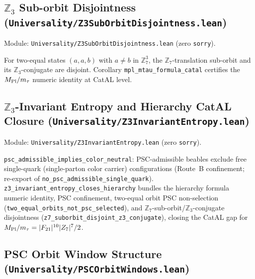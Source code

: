 \documentclass[11pt,a4paper]{article}
\newenvironment{keybox}[1]{%
  \Needspace*{8\baselineskip}%
  \begin{tcolorbox}[
    enhanced,
    breakable=false,
    colback=blue!5,
    colframe=blue!45!black,
    coltitle=black,
    colbacktitle=blue!14,
    boxrule=0.85pt,
    arc=2.5pt,
    left=9pt, right=9pt, top=6pt, bottom=6pt,
    titlerule=0.55pt,
    fonttitle=\bfseries,
    title={#1},
    before upper=\raggedright,
    before skip=0.9\baselineskip,
    after skip=0.9\baselineskip
  ]%
}{%
  \end{tcolorbox}%
}
\theoremstyle{definition}
\begin{document}
\subsection{$\mathbb{Z}_3$ Sub-orbit Disjointness
  (\texttt{Universality/\allowbreak Z3SubOrbitDisjointness.lean})}\label{subsec:z3-suborbit}

Module: \texttt{Universality/Z3SubOrbitDisjointness.lean} (zero \lstinline|sorry|).

\begin{keybox}{\lstinline|z7_suborbit_disjoint_z3_conjugate| (zero \texttt{sorry})}
For two-equal states $(a,a,b)$ with $a \neq b$ in $\mathbb{Z}_7^3$, the
$\mathbb{Z}_7$-translation sub-orbit and its $\mathbb{Z}_3$-conjugate are disjoint.
Corollary \lstinline|mpl_mtau_formula_catal| certifies the $M_{\rm Pl}/m_\tau$ numeric
identity at CatAL level.
\end{keybox}

\subsection{$\mathbb{Z}_3$-Invariant Entropy and Hierarchy CatAL Closure
  (\texttt{Universality/\allowbreak Z3InvariantEntropy.lean})}\label{subsec:z3-invariant-entropy}

Module: \texttt{Universality/Z3InvariantEntropy.lean} (zero \lstinline|sorry|).

\begin{keybox}{\lstinline|z3_invariant_entropy_closes_hierarchy| (zero \texttt{sorry})}
\lstinline|psc_admissible_implies_color_neutral|: PSC-admissible beables exclude free
single-quark (single-parton color carrier) configurations (Route~B confinement;
re-export of \lstinline|no_psc_admissible_single_quark|).
\lstinline|z3_invariant_entropy_closes_hierarchy| bundles the hierarchy formula numeric
identity, PSC confinement, two-equal orbit PSC non-selection
(\lstinline|two_equal_orbits_not_psc_selected|), and
$\mathbb{Z}_7$-sub-orbit/$\mathbb{Z}_3$-conjugate disjointness
(\lstinline|z7_suborbit_disjoint_z3_conjugate|), closing the CatAL gap for
$M_{\rm Pl}/m_\tau = |F_{21}|^{10}|Z_7|^7/2$.
\end{keybox}

\subsection{PSC Orbit Window Structure
  (\texttt{Universality/\allowbreak PSCOrbitWindows.lean})}\label{subsec:psc-orbit-windows}
\end{document}
